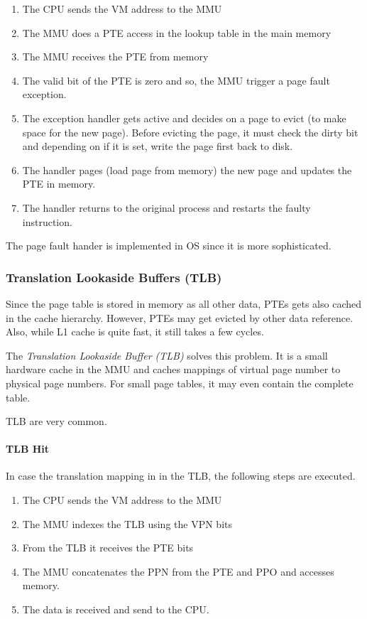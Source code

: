 \begin{enumerate}
    \item The CPU sends the VM address to the MMU
    \item The MMU does a PTE access in the lookup table in the main memory
    \item The MMU receives the PTE from memory
    \item The valid bit of the PTE is zero and so, the MMU trigger a page fault exception.
    \item The exception handler gets active and decides on a page to evict (to make space for the new page). Before evicting the page, it must check the dirty bit and depending on if it is set, write the page first back to disk.
    \item The handler pages (load page from memory) the new page and updates the PTE in memory.
    \item The handler returns to the original process and restarts the faulty instruction.
\end{enumerate}

The page fault hander is implemented in OS since it is more sophisticated.

\subsubsection{Translation Lookaside Buffers (TLB)}
Since the page table is stored in memory as all other data, PTEs gets also cached in the cache hierarchy. However, PTEs may get evicted by other data reference. Also, while L1 cache is quite fast, it still takes a few cycles.

The \textit{Translation Lookaside Buffer (TLB)} solves this problem. It is a small hardware cache in the MMU and caches mappings of virtual page number to physical page numbers. For small page tables, it may even contain the complete table.

TLB are very common.

\paragraph{TLB Hit}
In case the translation mapping in in the TLB, the following steps are executed.

\begin{enumerate}
    \item The CPU sends the VM address to the MMU
    \item The MMU indexes the TLB using the VPN bits
    \item From the TLB it receives the PTE bits
    \item The MMU concatenates the PPN from the PTE and PPO and accesses memory.
    \item The data is received and send to the CPU.
\end{enumerate}

